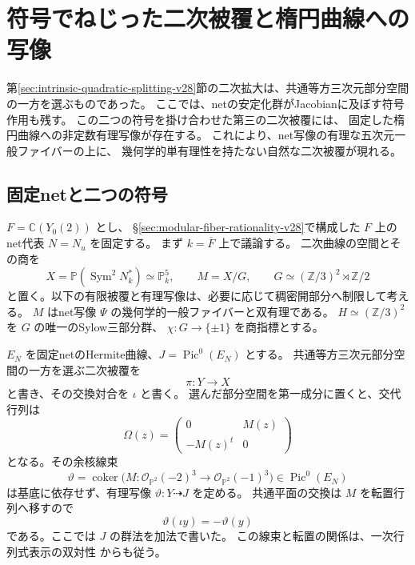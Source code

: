 \section{符号でねじった二次被覆と楕円曲線への写像}
\label{sec:third-quadratic-cover-v29}

第\ref{sec:intrinsic-quadratic-splitting-v28}節の二次拡大は、共通等方三次元部分空間の一方を選ぶものであった。
ここでは、netの安定化群がJacobianに及ぼす符号作用も残す。
この二つの符号を掛け合わせた第三の二次被覆には、
固定した楕円曲線への非定数有理写像が存在する。
これにより、net写像の有理な五次元一般ファイバーの上に、
幾何学的単有理性を持たない自然な二次被覆が現れる。

\subsection{固定netと二つの符号}

$F=\mathbb C(Y_0(2))$ とし、
\S\ref{sec:modular-fiber-rationality-v28}で構成した $F$ 上のnet代表 $N=N_u$ を固定する。
まず $k=\overline F$ 上で議論する。
二次曲線の空間とその商を
\[
 X=\mathbb P(\operatorname{Sym}^2N_k^*)\simeq\mathbb P_k^5,
 \qquad M=X/G,
 \qquad G\simeq(\mathbb Z/3)^2\rtimes\mathbb Z/2
\]
と置く。以下の有限被覆と有理写像は、必要に応じて稠密開部分へ制限して考える。
$M$ はnet写像 $\Psi$ の幾何学的一般ファイバーと双有理である。
$H\simeq(\mathbb Z/3)^2$ を $G$ の唯一のSylow三部分群、
$\chi:G\to\{\pm1\}$ を商指標とする。

$E_N$ を固定netのHermite曲線、$J=\operatorname{Pic}^0(E_N)$ とする。
共通等方三次元部分空間の一方を選ぶ二次被覆を
\[
 \pi:Y\longrightarrow X
\]
と書き、その交換対合を $\iota$ と書く。
選んだ部分空間を第一成分に置くと、交代行列は
\[
 \Omega(z)=\begin{pmatrix}0&M(z)\\-M(z)^t&0\end{pmatrix}
\]
となる。その余核線束
\[
 \vartheta=\operatorname{coker}
 \bigl(M:\mathcal O_{\mathbb P^2}(-2)^3
                    \longrightarrow\mathcal O_{\mathbb P^2}(-1)^3\bigr)
 \in\operatorname{Pic}^0(E_N)
\]
は基底に依存せず、有理写像 $\vartheta:Y\dashrightarrow J$ を定める。
共通平面の交換は $M$ を転置行列へ移すので
\begin{equation}
 \vartheta(\iota y)=-\vartheta(y)
 \label{eq:theta-deck-sign-v29}
\end{equation}
である。ここでは $J$ の群法を加法で書いた。
この線束と転置の関係は、一次行列式表示の双対性
\cite[Proposition~3.1]{BeauvilleDeterminantal}からも従う。

